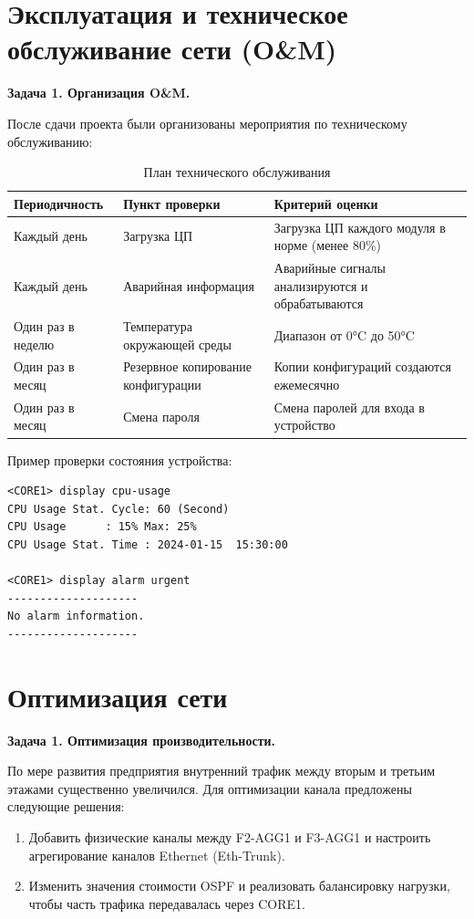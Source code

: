 \section{Эксплуатация и техническое обслуживание сети (O\&M)}

\textbf{Задача 1. Организация O\&M.}

После сдачи проекта были организованы мероприятия по техническому обслуживанию:

\begin{table}[h]
\tiny
\centering
\caption{План технического обслуживания}
\begin{tabular}{|l|l|l|}
\hline
\textbf{Периодичность} & \textbf{Пункт проверки} & \textbf{Критерий оценки} \\ \hline
Каждый день & Загрузка ЦП & Загрузка ЦП каждого модуля в норме (менее 80\%) \\ \hline
Каждый день & Аварийная информация & Аварийные сигналы анализируются и обрабатываются \\ \hline
Один раз в неделю & Температура окружающей среды & Диапазон от 0°C до 50°C \\ \hline
Один раз в месяц & Резервное копирование конфигурации & Копии конфигураций создаются ежемесячно \\ \hline
Один раз в месяц & Смена пароля & Смена паролей для входа в устройство \\ \hline
\end{tabular}
\end{table}

Пример проверки состояния устройства:

\begin{verbatim}
<CORE1> display cpu-usage
CPU Usage Stat. Cycle: 60 (Second)
CPU Usage      : 15% Max: 25%
CPU Usage Stat. Time : 2024-01-15  15:30:00

<CORE1> display alarm urgent
--------------------
No alarm information.
--------------------
\end{verbatim}

\section{Оптимизация сети}

\textbf{Задача 1. Оптимизация производительности.}

По мере развития предприятия внутренний трафик между вторым и третьим этажами существенно увеличился. Для оптимизации канала предложены следующие решения:

\begin{enumerate}
    \item Добавить физические каналы между F2-AGG1 и F3-AGG1 и настроить агрегирование каналов Ethernet (Eth-Trunk).
    \item Изменить значения стоимости OSPF и реализовать балансировку нагрузки, чтобы часть трафика передавалась через CORE1.
\end{enumerate}

